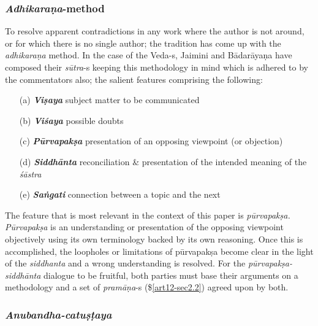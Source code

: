 \subsubsection{{{\sl\bfseries Adhikaraṇa}\relax}-method}

To resolve apparent contradictions in any work where the author is not around, or for which there is no single author; the tradition has come up with the {\sl adhikaraṇa} method. In the case of the Veda-s, Jaimini and Bādarāyaṇa have composed their {\sl sūtra}-s keeping this methodology in mind which is adhered to by the commentators also; the salient features comprising the following:
\begin{itemize}
\item[(a)] {{\sl\bfseries Viṣaya}\relax} subject matter to be communicated

\item[(b)] {{\sl\bfseries Viśaya}\relax} possible doubts

\item[(c)] {{\sl\bfseries Pūrvapakṣa}\relax} presentation of an opposing viewpoint (or objection)

\item[(d)] {{\sl\bfseries Siddhānta}\relax} reconciliation \& presentation of the intended meaning of the {\sl śāstra}

\item[(e)] {{\sl\bfseries Saṅgati}\relax} connection between a topic and the next 
\end{itemize}

The feature that is most relevant in the context of this paper is {\sl pūrvapakṣa. Pūrvapakṣa} is an understanding or presentation of the opposing viewpoint objectively using its own terminology backed by its own reasoning. Once this is accomplished, the loopholes or limitations of pūrvapakṣa become clear in the light of the {\sl siddhanta} and a wrong understanding is resolved. For the {\sl pūrvapakṣa-siddhānta} dialogue to be fruitful, both parties must base their arguments on a methodology and a set of {\sl pramāṇa}-s (\$\ref{art12-sec2.2}) agreed upon by both. 

\subsubsection{{\sl\bfseries Anubandha-catuṣṭaya}}\label{art12-sec2.5.4}


